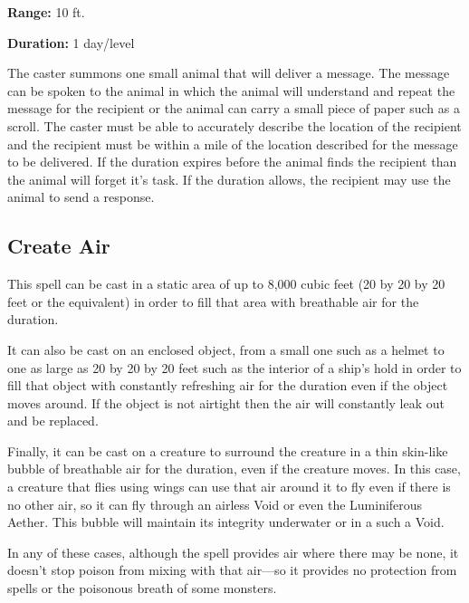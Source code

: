 \begin{multicols*}{2}
{\textbf{Range:} 10 ft.

\textbf{Duration:} 1 day/level}

The caster summons one small animal that will deliver a message. The message can be spoken to the animal in which the animal will understand and repeat the message for the recipient or the animal can carry a small piece of paper such as a scroll. The caster must be able to accurately describe the location of the recipient and the recipient must be within a mile of the location described for the message to be delivered. If the duration expires before the animal finds the recipient than the animal will forget it's task. If the duration allows, the recipient may use the animal to send a response. 

\subsection{Create Air}\label{spell:Create Air}

This spell can be cast in a static area of up to 8,000 cubic feet (20 by 20 by 20 feet or the equivalent) in order to fill that area with breathable air for the duration.

It can also be cast on an enclosed object, from a small one such as a helmet to one as large as 20 by 20 by 20 feet such as the interior of a ship’s hold in order to fill that object with constantly refreshing air for the duration even if the object moves around. If the object is not airtight then the air will constantly leak out and be replaced.

Finally, it can be cast on a creature to surround the creature in a thin skin-like bubble of breathable air for the duration, even if the creature moves. In this case, a creature that flies using wings can use that air around it to fly even if there is no other air, so it can fly through an airless Void or even the Luminiferous Aether. This bubble will maintain its integrity underwater or in a such a Void.

In any of these cases, although the spell provides air where there may be none, it doesn’t stop poison from mixing with that air—so it provides no protection from  spells or the poisonous breath of some monsters.


\end{multicols*}
